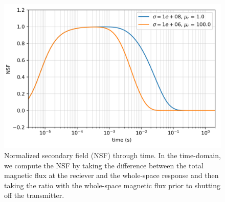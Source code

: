 \begin{figure}[htb]
    \begin{center}
    \includegraphics[width=0.6\columnwidth]{figures/casing_software/tdemNSF.png}
    \end{center}
\caption{
    Normalized secondary field (NSF) through time.
    In the time-domain, we compute the NSF by taking the difference between the total magnetic flux at the reciever and the whole-space response
    and then taking the ratio with the whole-space magnetic flux prior to shutting off the transmitter.
}
\label{fig:tdemNSF}
\end{figure}
